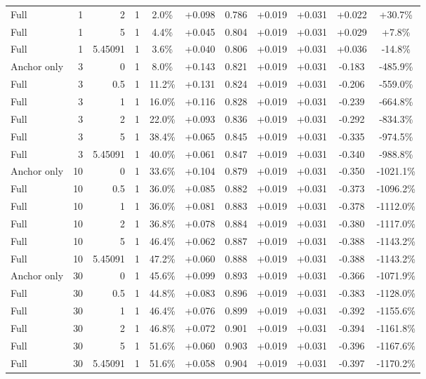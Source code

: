 \begin{table}[htbp]
\begin{tabular}{lrrrccccccc}
Full & 1 & 2 & 1 & 2.0\% & +0.098 & 0.786 & +0.019 & +0.031 & +0.022 & +30.7\% \\
Full & 1 & 5 & 1 & 4.4\% & +0.045 & 0.804 & +0.019 & +0.031 & +0.029 & +7.8\% \\
Full & 1 & 5.45091 & 1 & 3.6\% & +0.040 & 0.806 & +0.019 & +0.031 & +0.036 & -14.8\% \\
Anchor only & 3 & 0 & 1 & 8.0\% & +0.143 & 0.821 & +0.019 & +0.031 & -0.183 & -485.9\% \\
Full & 3 & 0.5 & 1 & 11.2\% & +0.131 & 0.824 & +0.019 & +0.031 & -0.206 & -559.0\% \\
Full & 3 & 1 & 1 & 16.0\% & +0.116 & 0.828 & +0.019 & +0.031 & -0.239 & -664.8\% \\
Full & 3 & 2 & 1 & 22.0\% & +0.093 & 0.836 & +0.019 & +0.031 & -0.292 & -834.3\% \\
Full & 3 & 5 & 1 & 38.4\% & +0.065 & 0.845 & +0.019 & +0.031 & -0.335 & -974.5\% \\
Full & 3 & 5.45091 & 1 & 40.0\% & +0.061 & 0.847 & +0.019 & +0.031 & -0.340 & -988.8\% \\
Anchor only & 10 & 0 & 1 & 33.6\% & +0.104 & 0.879 & +0.019 & +0.031 & -0.350 & -1021.1\% \\
Full & 10 & 0.5 & 1 & 36.0\% & +0.085 & 0.882 & +0.019 & +0.031 & -0.373 & -1096.2\% \\
Full & 10 & 1 & 1 & 36.0\% & +0.081 & 0.883 & +0.019 & +0.031 & -0.378 & -1112.0\% \\
Full & 10 & 2 & 1 & 36.8\% & +0.078 & 0.884 & +0.019 & +0.031 & -0.380 & -1117.0\% \\
Full & 10 & 5 & 1 & 46.4\% & +0.062 & 0.887 & +0.019 & +0.031 & -0.388 & -1143.2\% \\
Full & 10 & 5.45091 & 1 & 47.2\% & +0.060 & 0.888 & +0.019 & +0.031 & -0.388 & -1143.2\% \\
Anchor only & 30 & 0 & 1 & 45.6\% & +0.099 & 0.893 & +0.019 & +0.031 & -0.366 & -1071.9\% \\
Full & 30 & 0.5 & 1 & 44.8\% & +0.083 & 0.896 & +0.019 & +0.031 & -0.383 & -1128.0\% \\
Full & 30 & 1 & 1 & 46.4\% & +0.076 & 0.899 & +0.019 & +0.031 & -0.392 & -1155.6\% \\
Full & 30 & 2 & 1 & 46.8\% & +0.072 & 0.901 & +0.019 & +0.031 & -0.394 & -1161.8\% \\
Full & 30 & 5 & 1 & 51.6\% & +0.060 & 0.903 & +0.019 & +0.031 & -0.396 & -1167.6\% \\
Full & 30 & 5.45091 & 1 & 51.6\% & +0.058 & 0.904 & +0.019 & +0.031 & -0.397 & -1170.2\% \\

\end{tabular}
\end{table}
